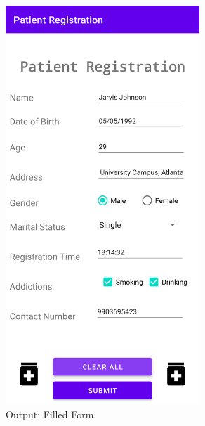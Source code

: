 \documentclass[12pt, a4]{article}
\begin{document}
\newpage
\subsection*{}
\begin{figure}[h]
\centering
\caption{Output: Filled Form.}
\includegraphics[height=15cm, width=7.3cm]{PatientRegistration/Screenshots/FilledForm.png}
\end{figure}

\newpage
\end{document}
